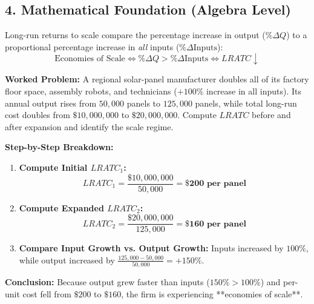 \documentclass[11pt,letterpaper]{article}
\begin{document}
\subsection*{4. Mathematical Foundation (Algebra Level)}
Long-run returns to scale compare the percentage increase in output ($\%\Delta Q$) to a proportional percentage increase in \emph{all} inputs ($\%\Delta \text{Inputs}$):
\begin{equation}
\text{Economies of Scale} \iff \%\Delta Q > \%\Delta \text{Inputs} \iff LRATC \downarrow
\end{equation}

\noindent\textbf{Worked Problem:}
A regional solar-panel manufacturer doubles all of its factory floor space, assembly robots, and technicians ($+100\%$ increase in all inputs). Its annual output rises from $50{,}000$ panels to $125{,}000$ panels, while total long-run cost doubles from $\$10{,}000{,}000$ to $\$20{,}000{,}000$. Compute $LRATC$ before and after expansion and identify the scale regime.

\noindent\textbf{Step-by-Step Breakdown:}
\begin{enumerate}
    \item \textbf{Compute Initial $LRATC_1$:}
    \[
    LRATC_1 = \frac{\$10{,}000{,}000}{50{,}000} = \mathbf{\$200\text{ per panel}}
    \]

    \item \textbf{Compute Expanded $LRATC_2$:}
    \[
    LRATC_2 = \frac{\$20{,}000{,}000}{125{,}000} = \mathbf{\$160\text{ per panel}}
    \]

    \item \textbf{Compare Input Growth vs. Output Growth:}
    Inputs increased by $100\%$, while output increased by $\frac{125{,}000 - 50{,}000}{50{,}000} = +150\%$.
\end{enumerate}
\textbf{Conclusion:} Because output grew faster than inputs ($150\% > 100\%$) and per-unit cost fell from $\$200$ to $\$160$, the firm is experiencing **economies of scale**.
\end{document}
